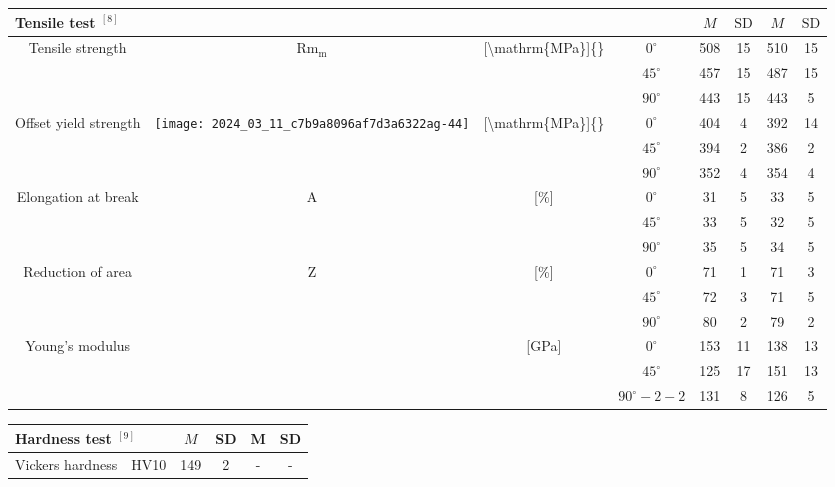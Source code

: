 \documentclass[10pt]{article}
\begin{document}
\begin{center}
\begin{tabular}{|c|c|c|c|c|c|c|c|}
\hline
\multicolumn{4}{|l|}{Tensile test ${ }^{[8]}$} & $M$ & $\mathrm{SD}$ & $M$ & $\mathrm{SD}$ \\
\hline
\multirow[t]{3}{*}{Tensile strength} & \multirow[t]{3}{*}{$\mathrm{Rm}_{\mathrm{m}}$} & \multirow[t]{3}{*}{[\textbackslash mathrm\{MPa\}]\{\}} & $0^{\circ}$ & 508 & 15 & 510 & 15 \\
\hline
 &  &  & $45^{\circ}$ & 457 & 15 & 487 & 15 \\
\hline
 &  &  & $90^{\circ}$ & 443 & 15 & 443 & 5 \\
\hline
\multirow[t]{3}{*}{Offset yield strength} & \multirow[t]{3}{*}{\texttt{[image: 2024\_03\_11\_c7b9a8096af7d3a6322ag-44]}
} & \multirow[t]{3}{*}{[\textbackslash mathrm\{MPa\}]\{\}} & $0^{\circ}$ & 404 & 4 & 392 & 14 \\
\hline
 &  &  & $45^{\circ}$ & 394 & 2 & 386 & 2 \\
\hline
 &  &  & $90^{\circ}$ & 352 & 4 & 354 & 4 \\
\hline
\multirow[t]{3}{*}{Elongation at break} & \multirow[t]{3}{*}{A} & \multirow[t]{3}{*}{[\%]} & $0^{\circ}$ & 31 & 5 & 33 & 5 \\
\hline
 &  &  & $45^{\circ}$ & 33 & 5 & 32 & 5 \\
\hline
 &  &  & $90^{\circ}$ & 35 & 5 & 34 & 5 \\
\hline
\multirow[t]{3}{*}{Reduction of area} & \multirow[t]{3}{*}{Z} & \multirow[t]{2}{*}{[\%]} & $0^{\circ}$ & 71 & 1 & 71 & 3 \\
\hline
 &  &  & $45^{\circ}$ & 72 & 3 & 71 & 5 \\
\hline
 &  &  & $90^{\circ}$ & 80 & 2 & 79 & 2 \\
\hline
\multirow[t]{3}{*}{Young's modulus} &  & \multirow[t]{3}{*}{[GPa]} & $0^{\circ}$ & 153 & 11 & 138 & 13 \\
\hline
 &  &  & $45^{\circ}$ & 125 & 17 & 151 & 13 \\
\hline
 &  &  & $90^{\circ}-2-2$ & 131 & 8 & 126 & 5 \\
\hline
\end{tabular}
\end{center}

\begin{center}
\begin{tabular}{|l|c|c|c|c|c|}
\hline
\multicolumn{2}{|l|}{Hardness test ${ }^{[9]}$} & $M$ & SD & M & SD \\
\hline
Vickers hardness & HV10 & 149 & 2 & - & - \\
\hline
\end{tabular}
\end{center}
\end{document}
